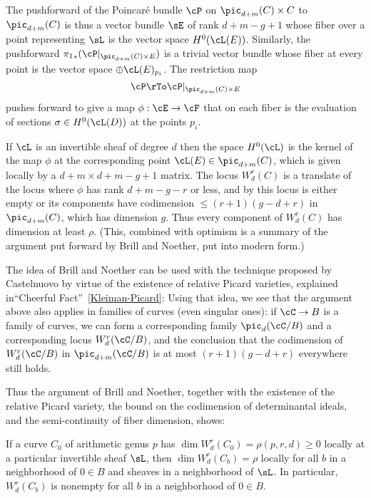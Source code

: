 The pushforward of the Poincar\'e bundle $\cP$ on $\pic_{d+m}(C) \times C$ to $\pic_{d+m}(C)$ is thus a vector
bundle $\sE$ of rank $d + m - g + 1$ whose fiber over a point representing $\sL$ is the vector space $H^0(\cL(E))$. Similarly,
the pushforward ${\pi_1}_*(\cP|_{\pic_{d+m}(C) \times E})$
is a trivial vector bundle whose fiber at every point is the vector space $\oplus \cL(E)_{p_i}$. The restriction map
$$
\cP  \rTo \cP|_{\pic_{d+m}(C) \times E}
$$
pushes forward to give a map $\phi : \cE \to \cF$ that on each fiber is the evaluation of sections $\sigma \in H^0(\cL(D))$ at the points $p_i$.

If $\cL$ is an invertible sheaf of degree $d$ then the space $H^0(\cL)$ is the kernel of the map $\phi$ at the corresponding point $\cL(E) \in \pic_{d+m}(C)$, which is given locally by a $d+m \times d+m-g+1$ matrix. The locus $W^r_d(C)$ is a translate of the locus where $\phi$ has rank $d+m-g-r$ or less, and by \cite[Exercise 10.9]{Eisenbud1995} this locus is either empty or its components have codimension $\leq (r+1)(g-d+r)$ in $\pic_{d+m}(C)$, which has dimension $g$. Thus every component of $W^r_d(C)$ has dimension at least $\rho$. (This, combined with optimism is a summary of the argument put forward by Brill and Noether, put into modern form.)


The idea of Brill and Noether can be used with the technique proposed by Castelnuovo by virtue
of the existence of relative Picard varieties, explained in``Cheerful Fact''~\ref{Kleiman-Picard}: Using that idea,
we see that the argument above also applies in
 families of curves (even singular ones): if $\cC \to B$ is a family of curves, we can form a corresponding family $\pic_d(\cC / B)$ and a corresponding locus $W^r_d(\cC / B)$, and the conclusion that the codimension of $W^r_d(\cC / B)$ in $\pic_{d+m}(\cC / B)$ is at most $(r+1)(g-d+r)$ everywhere still holds. 

Thus the argument of Brill and Noether, together with the existence of the relative Picard variety, the bound on the codimension of determinantal ideals,  and the semi-continuity of fiber dimension, shows:

\begin{theorem}\label{local existence}
If a curve $C_0$ of arithmetic genus $p$ has $\dim W^r_d(C_0) = \rho(p,r,d) \geq 0$
locally at a particular invertible sheaf $\sL$,  then $\dim W^r_d(C_b) = \rho$ locally for all $b$ in a neighborhood of $0 \in B$ and sheaves in a neighborhood of $\sL$. In particular, $W^r_d(C_b)$ is nonempty for all $b$ in a neighborhood of $0 \in B$.
\end{theorem}

